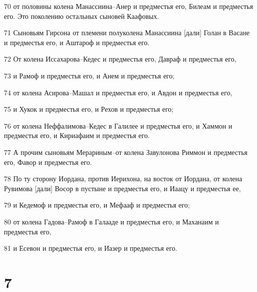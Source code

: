 \par 70 от половины колена Манассиина--Анер и предместья его, Билеам и предместья его. Это поколению остальных сыновей Каафовых.
\par 71 Сыновьям Гирсона от племени полуколена Манассиина [дали] Голан в Васане и предместья его, и Аштароф и предместья его.
\par 72 От колена Иссахарова--Кедес и предместья его, Давраф и предместья его,
\par 73 и Рамоф и предместья его, и Анем и предместья его;
\par 74 от колена Асирова--Машал и предместья его, и Авдон и предместья его,
\par 75 и Хукок и предместья его, и Рехов и предместья его;
\par 76 от колена Неффалимова--Кедес в Галилее и предместья его, и Хаммон и предместья его, и Кириафаим и предместья его.
\par 77 А прочим сыновьям Мерариным--от колена Завулонова Риммон и предместья его, Фавор и предместья его.
\par 78 По ту сторону Иордана, против Иерихона, на восток от Иордана, от колена Рувимова [дали] Восор в пустыне и предместья его, и Иаацу и предместья ее,
\par 79 и Кедемоф и предместья его, и Мефааф и предместья его;
\par 80 от колена Гадова--Рамоф в Галааде и предместья его, и Маханаим и предместья его,
\par 81 и Есевон и предместья его, и Иазер и предместья его.

\chapter{7}


